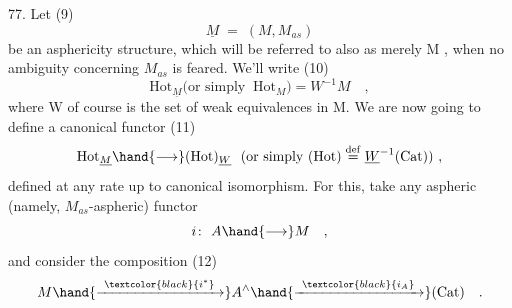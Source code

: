 \margin{$\ulcorner$}77.    Let
\margin{$\downarrow$}(9) \[ \underline{M} \;=\; (M,M_{as}) \]
be an asphericity structure,  which will be referred to also as merely
M ,  when no ambiguity concerning $M_{as}$  is feared.  We'll write
(10) \[ \mathrm{Hot}_{\underline{M}} \Big(\text{or simply }\ \mathrm{Hot}_{M}\Big) = W^{-1}M \quad , \]
where W of course is the set of weak equivalences in M.  We are now
going to define a canonical functor
(11) \[ \mathrm{Hot}_{\underline{M}} \hand{\longrightarrow} (\mathrm{Hot})_{\underline{W}} \ \ (\text{or simply } (\mathrm{Hot}) \overset{\mathrm{def}}{=} \underline{W}^{-1}(\mathrm{Cat})) \ , \]
defined at any rate up to canonical isomorphism.  For this,  take any
aspheric (namely, $M_{as}$-aspheric) functor
\[ i\colon\ A \hand{\longrightarrow} M \quad , \]
and consider the composition
(12) \[ M \hand{\xrightarrow{\ \textcolor{black}{i^{*}}\ }} A^{\wedge} \hand{\xrightarrow{\ \textcolor{black}{i_{A}}\ }} (\mathrm{Cat}) \quad . \]

